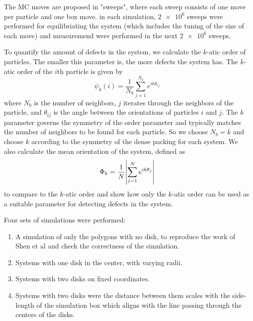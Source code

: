 \documentclass[12pt,a4paper]{article}
\begin{document}
	The MC moves are proposed in "sweeps", where each sweep consists of one move per particle and
	one box move. in each simulation, $\num{2e6}$ sweeps were performed for equilibriating the
	system (which includes the tuning of the size of each move) and measuremend were performed
	in the next $\num{2e6}$ sweeps.

	To quantify the amount of defects in the system, we calculate the $k$-atic order of particles.
	The smaller this parameter is, the more defects the system has. The $k$-atic order of the $i$th
	particle is given by
	\begin{equation}
		\psi_k(i) = \frac{1}{N_b}\sum_{j=1}^{N_b}e^{ik\theta_{ij}}
	\end{equation}
	where $N_b$ is the number of neighbors, $j$ iterates through the neighbors of the particle, and
	$\theta_{ij}$ is the angle between the orientations of particles $i$ and $j$. The $k$ parameter
	governs the symmetry of the order parameter and typically matches the number of neighbors to be
	found for each particle. So we choose $N_b = k$ and choose $k$ according to the symmetry of the
	dense packing for each system. We also calculate the mean orientation of the system, defined as
	\begin{equation}
		\Phi_k = \frac{1}{N}\abs{\sum_{j=1}^N e^{ik\theta_j}}
	\end{equation}
	to compare to the $k$-atic order and show how only the $k$-atic order can be used as a suitable
	parameter for detecting defects in the system.

	Four sets of simulations were performed:
	\begin{enumerate}
		\item A simulation of only the polygons with no disk, to reproduce the work of Shen et al
		and check the correctness of the simulation.
		\item Systems with one disk in the center, with varying radii.
		\item Systems with two disks on fixed coordinates.
		\item Systems with two disks were the distance between them scales with the side-length
		of the simulation box which aligns with the line passing through the centers of the disks.
	\end{enumerate}
\end{document}
